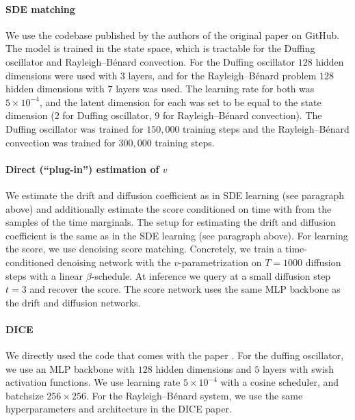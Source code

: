 \documentclass[oneside,11pt]{article}
\theoremstyle{remark}
\begin{document}
\paragraph{SDE matching} We use the codebase published by the authors of the original paper \cite{bartosh2025sdematching} on GitHub. The model is trained in the state space, which is tractable for the Duffing oscillator and Rayleigh--Bénard convection. For the Duffing oscillator $128$ hidden dimensions were used with $3$ layers, and for the Rayleigh--Bénard problem $128$ hidden dimensions with $7$ layers was used. The learning rate for both was $5 \times 10^{-4}$, and the latent dimension for each was set to be equal to the state dimension ($2$ for Duffing oscillator, $9$ for Rayleigh--Bénard convection). The Duffing oscillator was trained for $150,000$ training steps and the Rayleigh--Bénard convection was trained for $300,000$ training steps. 


\paragraph{Direct (``plug-in'') estimation of $v$}
We estimate the drift and diffusion coefficient as in SDE learning (see paragraph above) and additionally estimate the score conditioned on time with \cite{ho2020denoising} from the samples of the time marginals. The setup for estimating the drift and diffusion coefficient is the same as in the SDE learning (see paragraph above). For learning the score, we use denoising score matching. Concretely, we train a time-conditioned denoising network with the $v$-parametrization on $T = 1000$ diffusion steps with a linear $\beta$-schedule. At inference we query at a small diffusion step $t = 3$ and recover the score. The score network uses the same MLP backbone as the drift and diffusion networks.
















\paragraph{DICE} We directly used the code that comes with the paper \cite{blickhan-berman-stuart-etal:2025}. For the duffing oscillator, we use an MLP backbone with $128$ hidden dimensions and $5$ layers with swish activation functions. We use learning rate $5 \times 10^{-4}$ with a cosine scheduler, and batchsize $256 \times 256$. For the Rayleigh--B\'enard system, we use the same hyperparameters and architecture in the DICE paper.
\end{document}
